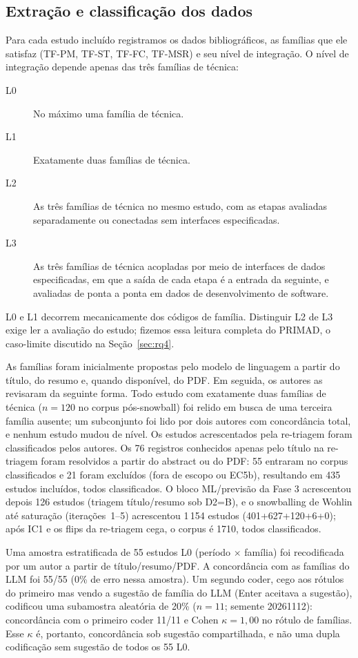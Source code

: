 \documentclass[preprint,12pt,authoryear=false]{elsarticle}
\newcommand{\PM}{TF-PM}
\newcommand{\ST}{TF-ST}
\newcommand{\FC}{TF-FC}
\newcommand{\MSR}{TF-MSR}
\begin{document}
\subsection{Extração e classificação dos dados}\label{sec:classification}

Para cada estudo incluído registramos os dados bibliográficos, as famílias que ele satisfaz (\PM{}, \ST{}, \FC{}, \MSR{}) e seu nível de integração. O nível de integração depende apenas das três famílias de técnica:

\begin{description}
\item[L0] No máximo uma família de técnica.
\item[L1] Exatamente duas famílias de técnica.
\item[L2] As três famílias de técnica no mesmo estudo, com as etapas avaliadas separadamente ou conectadas sem interfaces especificadas.
\item[L3] As três famílias de técnica acopladas por meio de interfaces de dados especificadas, em que a saída de cada etapa é a entrada da seguinte, e avaliadas de ponta a ponta em dados de desenvolvimento de software.
\end{description}

L0 e L1 decorrem mecanicamente dos códigos de família. Distinguir L2 de L3 exige ler a avaliação do estudo; fizemos essa leitura completa do PRIMAD, o caso-limite discutido na Seção~\ref{sec:rq4}.

As famílias foram inicialmente propostas pelo modelo de linguagem a partir do título, do resumo e, quando disponível, do PDF. Em seguida, os autores as revisaram da seguinte forma. Todo estudo com exatamente duas famílias de técnica ($n = 120$ no corpus pós-snowball) foi relido em busca de uma terceira família ausente; um subconjunto foi lido por dois autores com concordância total, e nenhum estudo mudou de nível. Os estudos acrescentados pela re-triagem foram classificados pelos autores. Os 76 registros conhecidos apenas pelo título na re-triagem foram resolvidos a partir do abstract ou do PDF: 55 entraram no corpus classificados e 21 foram excluídos (fora de escopo ou EC5b), resultando em 435 estudos incluídos, todos classificados. O bloco ML/previsão da Fase 3 acrescentou depois 126 estudos (triagem título/resumo sob D2=B), e o snowballing de Wohlin até saturação (iterações~1--5) acrescentou 1\,154 estudos (401+627+120+6+0); após IC1 e os flips da re-triagem cega, o corpus é 1710, todos classificados.

Uma amostra estratificada de 55 estudos L0 (período $\times$ família) foi recodificada por um autor a partir de título/resumo/PDF. A concordância com as famílias do LLM foi 55/55 (0\% de erro nessa amostra). Um segundo coder, cego aos rótulos do primeiro mas vendo a sugestão de família do LLM (Enter aceitava a sugestão), codificou uma subamostra aleatória de 20\% ($n = 11$; semente 20261112): concordância com o primeiro coder 11/11 e Cohen $\kappa = 1{,}00$ no rótulo de famílias. Esse $\kappa$ é, portanto, concordância sob sugestão compartilhada, e não uma dupla codificação sem sugestão de todos os 55 L0.
\end{document}
